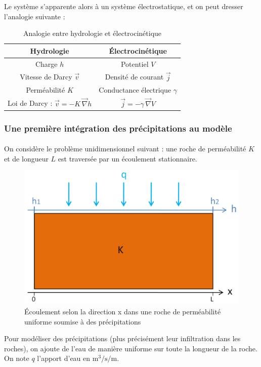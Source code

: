 \documentclass{article}
\begin{document}
Le système s’apparente alors à un système électrostatique, et on peut dresser l’analogie suivante :

\begin{table}[H]
    \centering
    \caption{Analogie entre hydrologie et électrocinétique}
    \begin{tabular}{ |c |c |}
    \hline
     \textbf{Hydrologie} & \textbf{Électrocinétique} \\ 
     \hline
     Charge $h$ & Potentiel $V$ \\ 
     \hline
     Vitesse de Darcy $\Vec{v}$ & Densité de courant $\Vec{j}$  \\
     \hline
    Perméabilité $K$ & Conductance électrique $\gamma$  \\
     \hline
    Loi de Darcy : $\Vec{v} = -K\,\Vec{\nabla} h$ & $\Vec{j} = -\gamma\,\Vec{\nabla} V$  \\
     \hline
    \end{tabular}
    \label{tab:analogie_hydro_elec}
\end{table}

\subsubsection{Une première intégration des précipitations au modèle}
\paragraph{} On considère le problème unidimensionnel suivant : une roche de perméabilité $K$ et de longueur $L$ est traversée par un écoulement stationnaire.

\begin{figure}[H]
    \centering
    \includegraphics[width=13cm]{A_III_B_3.png}
    \caption{Écoulement selon la direction x dans une roche de perméabilité uniforme soumise à des précipitations}
    \label{fig:ecoulement_précipitations}
\end{figure}
\newpage
Pour modéliser des précipitations (plus précisément leur infiltration dans les roches), on ajoute de l’eau de manière uniforme sur toute la longueur de la roche. On note $q$ l’apport d’eau en $\text{m}^3/\text{s}/\text{m}$.
\end{document}
